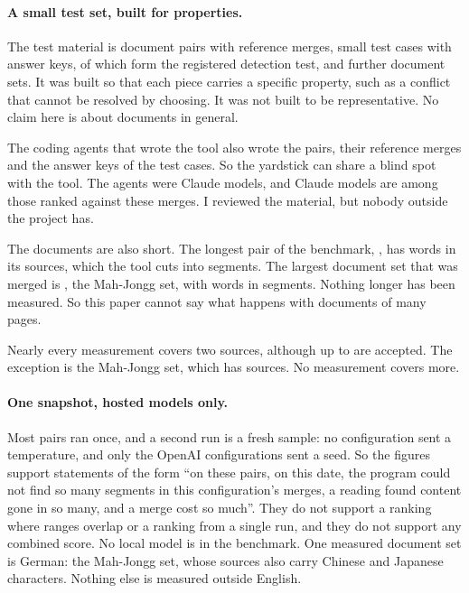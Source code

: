 \paragraph{A small test set, built for properties.} The test material is  document pairs with reference merges,  small test cases with answer keys, of which  form the registered detection test, and  further document sets. It was built so that each piece carries a specific property, such as a conflict that cannot be resolved by choosing. It was not built to be representative. No claim here is about documents in general.

The coding agents that wrote the tool also wrote the pairs, their reference merges and the answer keys of the test cases. So the yardstick can share a blind spot with the tool. The agents were Claude models, and Claude models are among those ranked against these merges. I reviewed the material, but nobody outside the project has.

The documents are also short. The longest pair of the benchmark, \texttt{}, has  words in its sources, which the tool cuts into  segments. The largest document set that was merged is \texttt{}, the Mah-Jongg set, with  words in  segments. Nothing longer has been measured. So this paper cannot say what happens with documents of many pages.

Nearly every measurement covers two sources, although up to  are accepted. The exception is the Mah-Jongg set, which has  sources. No measurement covers more.

\paragraph{One snapshot, hosted models only.} Most pairs ran once, and a second run is a fresh sample: no configuration sent a temperature, and only the OpenAI configurations sent a seed. So the figures support statements of the form ``on these pairs, on this date, the program could not find so many segments in this configuration's merges, a reading found content gone in so many, and a merge cost so much''. They do not support a ranking where ranges overlap or a ranking from a single run, and they do not support any combined score. No local model is in the benchmark. One measured document set is German: the Mah-Jongg set, whose sources also carry Chinese and Japanese characters. Nothing else is measured outside English.

